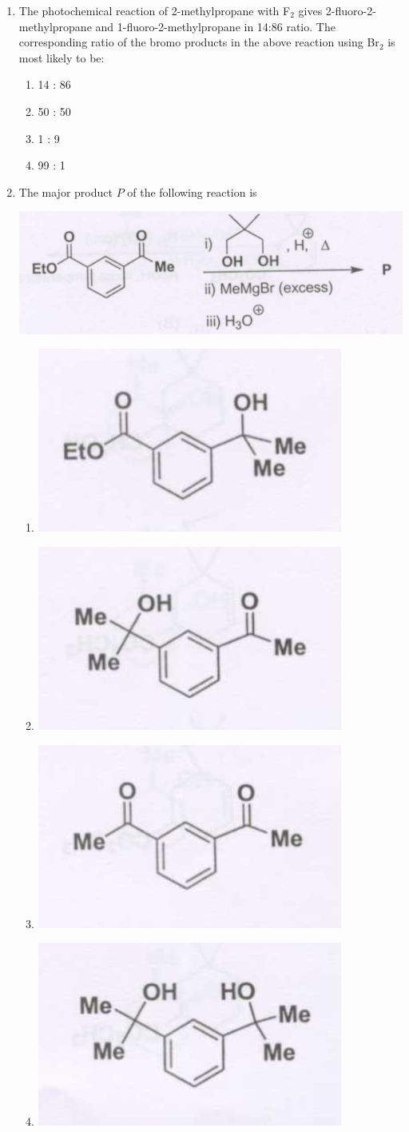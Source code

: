 \documentclass[12pt]{article}
\begin{document}
\begin{enumerate}
\item The photochemical reaction of 2-methylpropane with F$_2$ gives 2-fluoro-2-methylpropane and 1-fluoro-2-methylpropane in 14:86 ratio. The corresponding ratio of the bromo products in the above reaction using Br$_2$ is most likely to be:
\begin{enumerate}
\item 14 : 86
\item 50 : 50
\item 1 : 9
\item 99 : 1    
\end{enumerate}
\hfill{}


\item The major product $P$ of the following reaction is

\begin{center}
\includegraphics[width=0.6\columnwidth]{figs/q44.png}
\end{center}    \hfill{}
\begin{enumerate}
    \item \includegraphics[width=0.2\columnwidth]{figs/q44 a.png}
    \item \includegraphics[width=0.2\columnwidth]{figs/q44 b.png}
    \item \includegraphics[width=0.2\columnwidth]{figs/q44 c.png}
    \item \includegraphics[width=0.2\columnwidth]{figs/q44 d.png}
\end{enumerate}



\end{enumerate}
\end{document}
